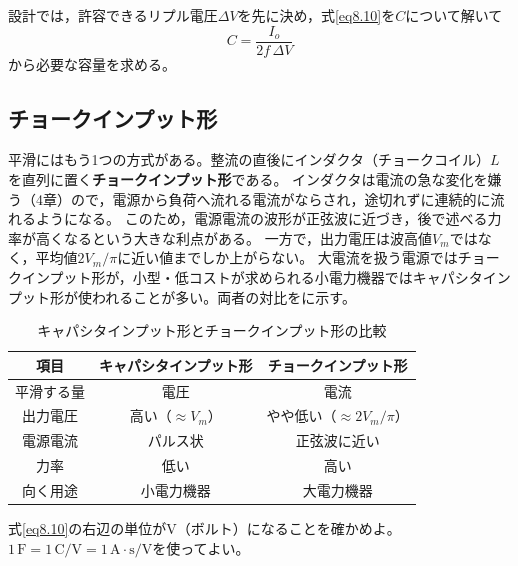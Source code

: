 設計では，許容できるリプル電圧$\mathit{\Delta}V$を先に決め，式\ref{eq8.10}を$C$について解いて
\begin{equation}
C = \frac{I_o}{2 f\, \mathit{\Delta}V}
\label{eq8.11}
\end{equation}
から必要な容量を求める。

\subsection{チョークインプット形}

平滑にはもう1つの方式がある。整流の直後にインダクタ（チョークコイル）$L$を直列に置く\textbf{チョークインプット形}である。
インダクタは電流の急な変化を嫌う（4章）ので，電源から負荷へ流れる電流がならされ，途切れずに連続的に流れるようになる。
このため，電源電流の波形が正弦波に近づき，後で述べる力率が高くなるという大きな利点がある。
一方で，出力電圧は波高値$V_m$ではなく，平均値$2V_m/\pi$に近い値までしか上がらない。
大電流を扱う電源ではチョークインプット形が，小型・低コストが求められる小電力機器ではキャパシタインプット形が使われることが多い。両者の対比をに示す。

\begin{table}[ht]
\begin{center}
\caption{キャパシタインプット形とチョークインプット形の比較}
\label{tab8.2}
\begin{tabular}{c|c|c}
\hline
項目 & キャパシタインプット形 & チョークインプット形 \\
\hline
平滑する量 & 電圧 & 電流 \\
出力電圧 & 高い（$\approx V_m$） & やや低い（$\approx 2V_m/\pi$） \\
電源電流 & パルス状 & 正弦波に近い \\
力率 & 低い & 高い \\
向く用途 & 小電力機器 & 大電力機器 \\
\hline
\end{tabular}
\end{center}
\end{table}

\begin{問}
\item 式\ref{eq8.10}の右辺の単位が$\mathrm{V}$（ボルト）になることを確かめよ。
$1\,\mathrm{F} = 1\,\mathrm{C/V} = 1\,\mathrm{A\cdot s/V}$を使ってよい。
\end{問}



